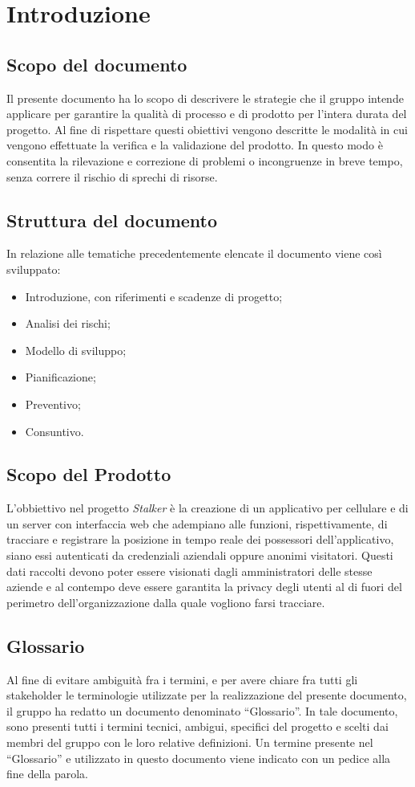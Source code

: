 \section{Introduzione}
\subsection{Scopo del documento}
Il presente documento ha lo scopo di descrivere le strategie che il gruppo \Gruppo{} intende applicare per garantire la qualità di processo e di prodotto per l’intera durata del progetto.
Al fine di rispettare questi obiettivi vengono descritte le modalità in cui vengono effettuate la verifica e la validazione del prodotto.
In questo modo è consentita la rilevazione e correzione di problemi o incongruenze in breve tempo, senza correre il rischio di sprechi di risorse.

\subsection{Struttura del documento}
In relazione alle tematiche precedentemente elencate il documento viene così sviluppato:
\begin{itemize}
    \item Introduzione, con riferimenti e scadenze di progetto;
    \item Analisi dei rischi;
    \item Modello di sviluppo;
    \item Pianificazione;
    \item Preventivo;
    \item Consuntivo.
\end{itemize}

\subsection{Scopo del Prodotto}
L'obbiettivo nel progetto \textit{Stalker} è la creazione di un applicativo per cellulare e di un server con interfaccia web che adempiano alle funzioni, rispettivamente, di 
tracciare e registrare la posizione in tempo reale dei possessori dell'applicativo, siano essi autenticati da credenziali aziendali oppure anonimi visitatori.
Questi dati raccolti devono poter essere visionati dagli amministratori delle stesse aziende e al contempo deve essere garantita la privacy degli utenti al di fuori del perimetro dell'organizzazione dalla quale vogliono farsi tracciare.

\subsection{Glossario}
Al fine di evitare ambiguità fra i termini, e per avere chiare fra tutti gli stakeholder le terminologie utilizzate per la realizzazione del presente documento, il gruppo \Gruppo{} ha redatto un documento denominato “Glossario”.
In tale documento, sono presenti tutti i termini tecnici, ambigui, specifici del progetto e scelti dai membri del gruppo con le loro relative definizioni.
Un termine presente nel “Glossario” e utilizzato in questo documento viene indicato con un pedice  alla fine della parola.

